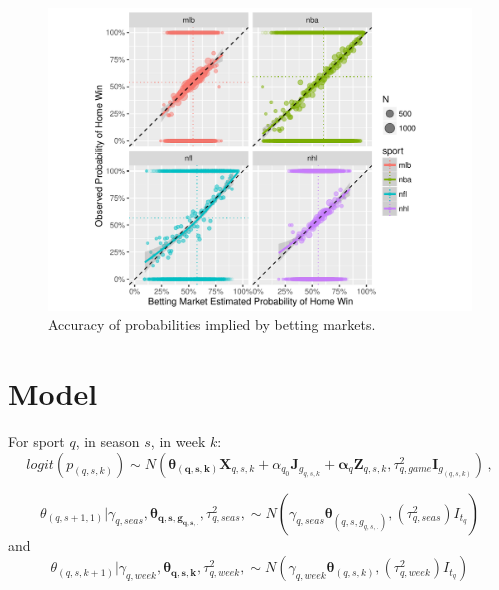 \documentclass{beamer}\usepackage[]{graphicx}\usepackage[]{color}
\makeatletter
\def\maxwidth{ %
  \ifdim\Gin@nat@width>\linewidth
    \linewidth
  \else
    \Gin@nat@width
  \fi
}
\newenvironment{knitrout}{}{} %
\makeatother
\begin{document}
\begin{frame}[fragile]
\begin{knitrout}
\color{fgcolor}\begin{figure}
\includegraphics[width=\maxwidth]{figure/betting-1} \caption[Accuracy of probabilities implied by betting markets]{Accuracy of probabilities implied by betting markets. }\label{fig:betting}
\end{figure}


\end{knitrout}
\end{frame}

\section{Model}
\begin{frame}
For sport $q$, in season $s$, in week $k$: 
$$
logit(p_{(q,s,k)}) \sim N(\mathbf{\theta_{(q,s,k)}}\mathbf{X}_{q,s,k} + \alpha_{q_0}\mathbf{J}_{g_{q,s,k}} + \mathbf{\alpha}_{q}\mathbf{Z}_{q,s,k}, \tau^{2}_{q,game}\mathbf{I}_{g_{(q,s,k)}}) \,, 
$$

$$
\theta_{(q,s+1,1)} | \gamma_{q,seas}, \mathbf{\theta_{q,s,g_{q,s,.}}}, \tau^{2}_{q,seas},  \sim N (\gamma_{q,seas}\mathbf{\theta}_{(q,s,g_{q,s,.})},(\tau^{2}_{q,seas})I_{t_{q}})
$$
and 
$$
\theta_{(q,s,k+1)} | \gamma_{q,week}, \mathbf{\theta_{q,s,k}}, \tau^{2}_{q,week},  \sim N (\gamma_{q,week}\mathbf{\theta}_{(q,s,k)},(\tau^{2}_{q,week})I_{t_{q}})
$$
\end{frame}
\end{document}
